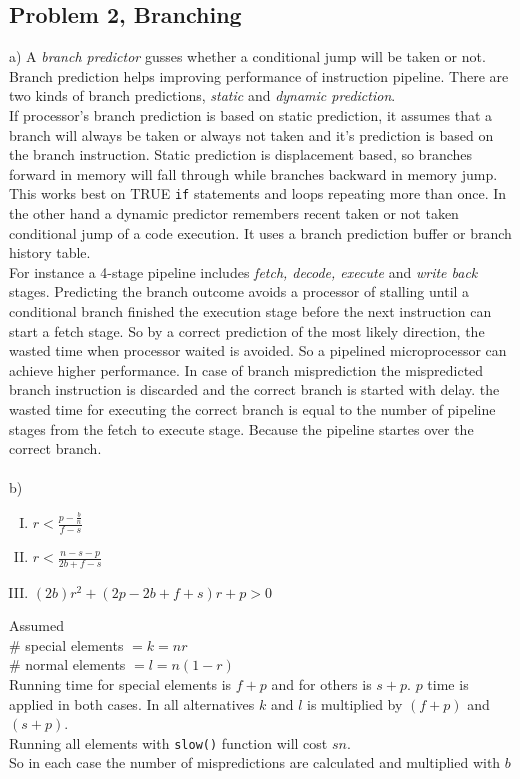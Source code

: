 \documentclass{article}
\begin{document}
\subsection{Problem 2, Branching}
a) A \textit{branch predictor} gusses whether a conditional jump will be taken or not. Branch prediction helps improving performance of instruction pipeline. There are two kinds of branch predictions, \textit{static} and \textit{dynamic prediction}.\\
If processor's branch prediction is based on static prediction, it assumes that a branch will always be taken or always not taken and it's prediction is based on the branch instruction. Static prediction is displacement based, so branches forward in memory will fall through while branches backward in memory jump. This works best on TRUE \texttt{if} statements and loops repeating more than once.
In the other hand a dynamic predictor remembers recent taken or not taken conditional jump of a code execution. It uses a branch prediction buffer or branch history table.\\
For instance a 4-stage pipeline includes \textit{fetch, decode, execute} and \textit{write back} stages. Predicting the branch outcome avoids a processor of stalling until a conditional branch finished the execution stage before the next instruction can start a fetch stage. So by a correct prediction of the most likely direction, the wasted time when processor waited is avoided. So a pipelined microprocessor can achieve higher performance. In case of branch misprediction the mispredicted branch instruction is discarded and the correct branch is started with delay. the wasted time for executing the correct branch is equal to the number of pipeline stages from the fetch to execute stage. Because the pipeline startes over the correct branch.\\~\\



b) 
\begin{enumerate}[I)]
    \item $r < \frac{p-\frac{b}{n}}{f-s} $
    \item $ r < \frac{n-s-p}{2b+f-s} $
    \item $ (2b)r^2 + (2p-2b+f+s)r + p > 0 $ 
\end{enumerate}
Assumed\\
\# special elements $=k= nr$ \\
\# normal elements $=l= n(1-r)$\\
Running time for special elements is $f+p$ and for others is $s+p$. $p$ time is applied in both cases. In all alternatives $k$ and $l$ is multiplied by $(f+p)$ and $(s+p)$. \\
Running all elements with \texttt{slow()} function will cost $sn$. \\
So in each case the number of mispredictions are calculated and multiplied with $b$
\end{document}
